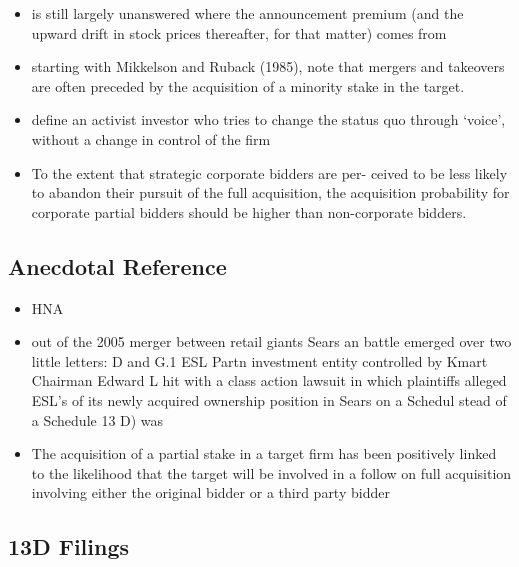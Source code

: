 \documentclass[12pt]{article}
\begin{document}
\begin{itemize}
        \item is still largely unanswered where the announcement premium (and the upward drift in stock prices thereafter, for that matter) comes from \citep{Greenwood2009}

        \item starting with Mikkelson and Ruback (1985), note that mergers and takeovers are often preceded by the acquisition of a minority stake in the target. \citep{Greenwood2009}

        \item define an activist investor who tries to change the status quo through ‘voice’, without a change in control of the firm \citep{Greenwood2009}

        \item To the extent that strategic corporate bidders are per- ceived to be less likely to abandon their pursuit of the full acquisition, the acquisition probability for corporate partial bidders should be higher than non-corporate bidders.

    \end{itemize}

\subsection{Anecdotal Reference}

    \begin{itemize}
        \item HNA
        \item out of the 2005 merger between retail giants Sears an battle emerged over two little letters: D and G.1 ESL Partn investment entity controlled by Kmart Chairman Edward L hit with a class action lawsuit in which plaintiffs alleged ESL's of its newly acquired ownership position in Sears on a Schedul stead of a Schedule 13 D) was \citep{Giglia2018}

        \item The acquisition of a partial stake in a target firm has been positively linked to the likelihood that the target will be involved in a follow on full acquisition involving either the original bidder or a third party bidder \citep{Akhigbe2007}

    \end{itemize}

\subsection{13D Filings}
\end{document}
